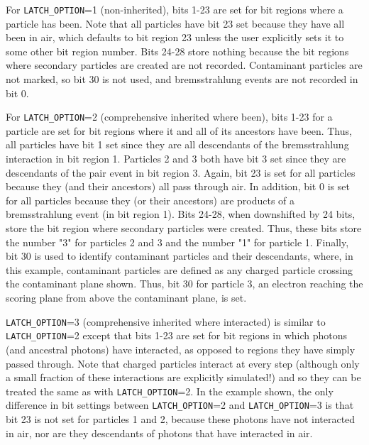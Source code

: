 \documentclass[12pt,twoside]{article}
\begin{document}
For {\tt LATCH\_OPTION}=1 (non-inherited), bits 1-23 are set for bit regions
where a particle has been.  Note that all particles have bit 23 set because they
have all been in air, which defaults to bit region 23 unless the user explicitly
sets it to some other bit region number.  Bits 24-28 store nothing because the
bit regions where secondary particles are created are not recorded.  Contaminant
particles are not marked, so bit 30 is not used, and bremsstrahlung events are
not recorded in bit 0.

For {\tt LATCH\_OPTION}=2 (comprehensive inherited where been), bits 1-23 for a
particle are set for bit regions where it and all of its ancestors have been.
Thus, all particles have bit 1 set since they are all descendants of the
bremsstrahlung interaction in bit region 1. Particles 2 and 3 both have bit 3
set since they are descendants of the pair event in bit region 3.  Again, bit 23
is set for all particles because they (and their ancestors) all pass through
air.  In addition, bit 0 is set for all particles because they (or their
ancestors) are products of a bremsstrahlung event (in bit region 1).  Bits
24-28, when downshifted by 24 bits, store the bit region where secondary
particles were created.  Thus, these bits store the number "3" for particles 2
and 3 and the number "1" for particle 1.  Finally, bit 30 is used to identify
contaminant particles and their descendants, where, in this example, contaminant
particles are defined as any charged particle crossing the contaminant plane
shown.  Thus, bit 30 for particle 3, an electron reaching the scoring plane from
above the contaminant plane, is set.

{\tt LATCH\_OPTION}=3 (comprehensive inherited where interacted) is similar to
{\tt LATCH\_OPTION}=2 except that bits 1-23 are set for bit regions in which
photons (and ancestral photons) have interacted, as opposed to regions they have
simply passed through.  Note that charged particles interact at every step
(although only a small fraction of these interactions are explicitly simulated!)
and so they can be treated the same as with {\tt LATCH\_OPTION}=2.  In the
example shown, the only difference in bit settings between {\tt LATCH\_OPTION}=2
and {\tt LATCH\_OPTION}=3 is that bit 23 is not set for particles 1 and 2,
because these photons have not interacted in air, nor are they descendants of
photons that have interacted in air.
\end{document}
